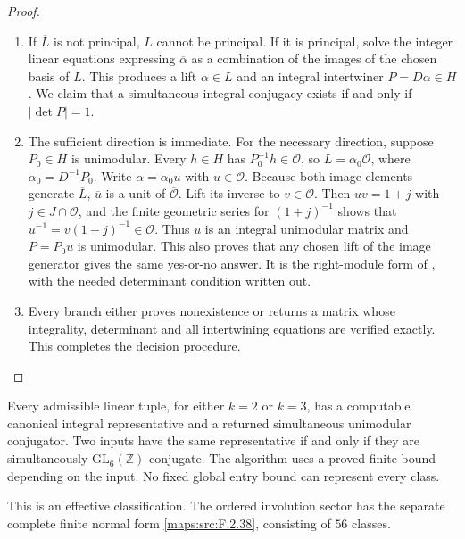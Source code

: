 \begin{proof}
\begin{enumerate}[label={$\langle1\rangle$\arabic*.}]
\item If $\overline L$ is not principal, $L$ cannot be principal. If it is
principal, solve the integer linear equations expressing
$\overline\alpha$ as a combination of the images of the chosen basis
of $L$. This produces a lift $\alpha\in L$ and an integral
intertwiner $P=D\alpha\in H$. We claim that a simultaneous integral
conjugacy exists if and only if $|\det P|=1$.

\item The sufficient direction is immediate. For the necessary direction,
suppose $P_0\in H$ is unimodular. Every $h\in H$ has
$P_0^{-1}h\in\mathcal O$, so
$L=\alpha_0\mathcal O$, where $\alpha_0=D^{-1}P_0$.
Write $\alpha=\alpha_0u$ with $u\in\mathcal O$.
Because both image elements generate $\overline L$,
$\overline u$ is a unit of $\overline{\mathcal O}$.
Lift its inverse to $v\in\mathcal O$. Then $uv=1+j$ with
$j\in J\cap\mathcal O$, and the finite geometric series for
$(1+j)^{-1}$ shows that $u^{-1}=v(1+j)^{-1}\in\mathcal O$.
Thus $u$ is an integral unimodular matrix and
$P=P_0u$ is unimodular. This also proves that any chosen lift of the
image generator gives the same yes-or-no answer. It is the
right-module form of \cite[Theorem 3.4, p.~6; Propositions 8.1--8.2, p.~21]{rootBHJ22},
with the needed determinant condition written out.

\item Every branch either proves nonexistence or returns a matrix whose
integrality, determinant and all intertwining equations are verified
exactly. This completes the decision procedure.

\end{enumerate}
\end{proof}




\begin{theorem}\hypertarget{tag-02NS}{}\label{maps:src:F.2.37}


Every admissible linear tuple, for either $k=2$ or $k=3$,
has a computable canonical integral representative and a
returned simultaneous unimodular conjugator. Two inputs have
the same representative if and only if they are simultaneously
$\mathrm{GL}_6(\mathbb Z)$ conjugate. The algorithm uses a proved
finite bound depending on the input. No fixed global entry bound
can represent every class.

This is an effective classification. The
ordered involution sector has the separate complete finite
normal form \ref{maps:src:F.2.38}, consisting of $56$ classes. 

\end{theorem}


